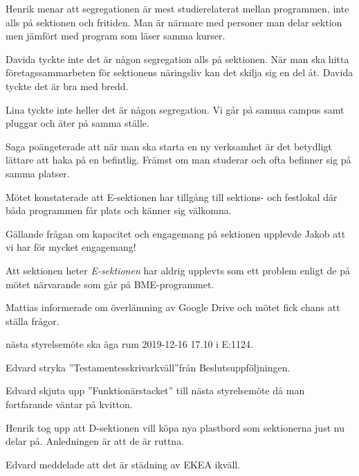 \documentclass[10pt]{article}
\begin{document}
\begin{paragrafer}
Henrik menar att segregationen är mest studierelaterat mellan programmen, inte alls på sektionen och fritiden. Man är närmare med personer man delar sektion men jämfört med program som läser samma kurser.

Davida tyckte inte det är någon segregation alls på sektionen. När man ska hitta företagssammarbeten för sektionens näringsliv kan det skilja sig en del åt. Davida tyckte det är bra med bredd. 

Lina tyckte inte heller det är någon segregation. Vi går på samma campus samt pluggar och äter på samma ställe.

Saga poängeterade att när man ska starta en ny verksamhet är det betydligt lättare att haka på en befintlig. Främst om man studerar och ofta befinner sig på samma platser. 

Mötet konstaterade att E-sektionen har tillgång till sektions- och festlokal där båda programmen får plats och känner sig välkomna.

Gällande frågan om kapacitet och engagemang på sektionen upplevde Jakob att vi har för mycket engagemang!

Att sektionen heter \textit{E-sektionen} har aldrig upplevts som ett problem enligt de på mötet närvarande som går på BME-programmet. 

Mattias informerade om överlämning av Google Drive och mötet fick chans att ställa frågor.


\Mba nästa styrelsemöte ska äga rum 2019-12-16 17.10 i E:1124.


Edvard \ypa stryka ''Testamentesskrivarkväll''från Beslutsuppföljningen. 

\Mbaby

Edvard \ypa skjuta upp ''Funktionärstacket'' till nästa styrelsemöte då man fortfarande väntar på kvitton. 

\Mbaby


Henrik tog upp att D-sektionen vill köpa nya plastbord som sektionerna just nu delar på. Anledningen är att de är ruttna. 

Edvard meddelade att det är städning av EKEA ikväll. 


\end{paragrafer}
\end{document}
